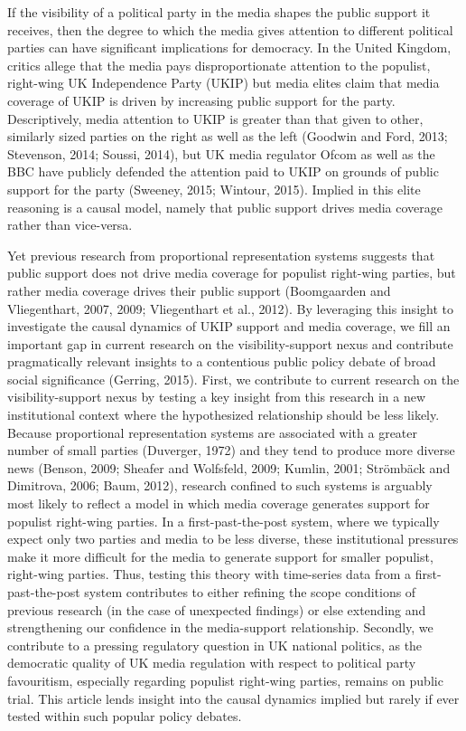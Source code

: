 \documentclass[12pt,article]{article}
\begin{document}
If the visibility of a political party in the media shapes the public
support it receives, then the degree to which the media gives attention
to different political parties can have significant implications for
democracy. In the United Kingdom, critics allege that the media pays
disproportionate attention to the populist, right-wing UK Independence
Party (UKIP) but media elites claim that media coverage of UKIP is
driven by increasing public support for the party. Descriptively, media
attention to UKIP is greater than that given to other, similarly sized
parties on the right as well as the left (Goodwin and Ford, 2013;
Stevenson, 2014; Soussi, 2014), but UK media regulator Ofcom as well as
the BBC have publicly defended the attention paid to UKIP on grounds of
public support for the party (Sweeney, 2015; Wintour, 2015). Implied in
this elite reasoning is a causal model, namely that public support
drives media coverage rather than vice-versa.

Yet previous research from proportional representation systems suggests
that public support does not drive media coverage for populist
right-wing parties, but rather media coverage drives their public
support (Boomgaarden and Vliegenthart, 2007, 2009; Vliegenthart et al.,
2012). By leveraging this insight to investigate the causal dynamics of
UKIP support and media coverage, we fill an important gap in current
research on the visibility-support nexus and contribute pragmatically
relevant insights to a contentious public policy debate of broad social
significance (Gerring, 2015). First, we contribute to current research
on the visibility-support nexus by testing a key insight from this
research in a new institutional context where the hypothesized
relationship should be less likely. Because proportional representation
systems are associated with a greater number of small parties (Duverger,
1972) and they tend to produce more diverse news (Benson, 2009; Sheafer
and Wolfsfeld, 2009; Kumlin, 2001; Str{ö}mb{ä}ck and Dimitrova, 2006;
Baum, 2012), research confined to such systems is arguably most likely
to reflect a model in which media coverage generates support for
populist right-wing parties. In a first-past-the-post system, where we
typically expect only two parties and media to be less diverse, these
institutional pressures make it more difficult for the media to generate
support for smaller populist, right-wing parties. Thus, testing this
theory with time-series data from a first-past-the-post system
contributes to either refining the scope conditions of previous research
(in the case of unexpected findings) or else extending and strengthening
our confidence in the media-support relationship. Secondly, we
contribute to a pressing regulatory question in UK national politics, as
the democratic quality of UK media regulation with respect to political
party favouritism, especially regarding populist right-wing parties,
remains on public trial. This article lends insight into the causal
dynamics implied but rarely if ever tested within such popular policy
debates.
\end{document}
